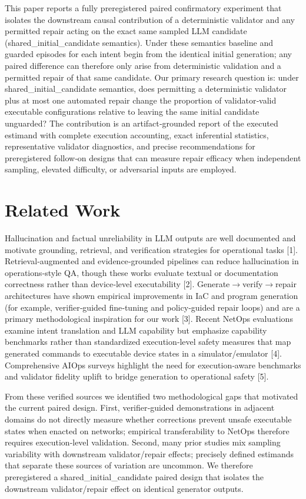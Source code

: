 \documentclass[conference]{IEEEtran}
\begin{document}
This paper reports a fully preregistered paired confirmatory experiment that isolates the downstream causal contribution of a deterministic validator and any permitted repair acting on the exact same sampled LLM candidate (shared\_initial\_candidate semantics). Under these semantics baseline and guarded episodes for each intent begin from the identical initial generation; any paired difference can therefore only arise from deterministic validation and a permitted repair of that same candidate. Our primary research question is: under shared\_initial\_candidate semantics, does permitting a deterministic validator plus at most one automated repair change the proportion of validator‑valid executable configurations relative to leaving the same initial candidate unguarded? The contribution is an artifact‑grounded report of the executed estimand with complete execution accounting, exact inferential statistics, representative validator diagnostics, and precise recommendations for preregistered follow‑on designs that can measure repair efficacy when independent sampling, elevated difficulty, or adversarial inputs are employed.

\section{Related Work}
Hallucination and factual unreliability in LLM outputs are well documented and motivate grounding, retrieval, and verification strategies for operational tasks [1]. Retrieval‑augmented and evidence‑grounded pipelines can reduce hallucination in operations‑style QA, though these works evaluate textual or documentation correctness rather than device‑level executability [2]. Generate\ensuremath{\rightarrow}verify\ensuremath{\rightarrow}repair architectures have shown empirical improvements in IaC and program generation (for example, verifier‑guided fine‑tuning and policy‑guided repair loops) and are a primary methodological inspiration for our work [3]. Recent NetOps evaluations examine intent translation and LLM capability but emphasize capability benchmarks rather than standardized execution‑level safety measures that map generated commands to executable device states in a simulator/emulator [4]. Comprehensive AIOps surveys highlight the need for execution‑aware benchmarks and validator fidelity uplift to bridge generation to operational safety [5].

From these verified sources we identified two methodological gaps that motivated the current paired design. First, verifier‑guided demonstrations in adjacent domains do not directly measure whether corrections prevent unsafe executable states when enacted on networks; empirical transferability to NetOps therefore requires execution‑level validation. Second, many prior studies mix sampling variability with downstream validator/repair effects; precisely defined estimands that separate these sources of variation are uncommon. We therefore preregistered a shared\_initial\_candidate paired design that isolates the downstream validator/repair effect on identical generator outputs.
\end{document}
